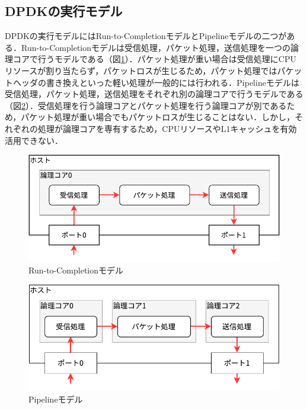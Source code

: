 \subsection{DPDKの実行モデル}
DPDKの実行モデルにはRun-to-CompletionモデルとPipelineモデルの二つがある．Run-to-Completionモデルは受信処理，パケット処理，送信処理を一つの論理コアで行うモデルである（図\ref{fig:RunToCompletion}）．パケット処理が重い場合は受信処理にCPUリソースが割り当たらず，パケットロスが生じるため，パケット処理ではパケットヘッダの書き換えといった軽い処理が一般的には行われる．Pipelineモデルは受信処理，パケット処理，送信処理をそれぞれ別の論理コアで行うモデルである（図\ref{fig:Pipeline}）．受信処理を行う論理コアとパケット処理を行う論理コアが別であるため，パケット処理が重い場合でもパケットロスが生じることはない．しかし，それぞれの処理が論理コアを専有するため，CPUリソースやL1キャッシュを有効活用できない．

\begin{figure}[htb]
  \centering
  \includegraphics[width=\columnwidth]{pictures/RunToCompletion.pdf}
  \caption{Run-to-Completionモデル}
  \label{fig:RunToCompletion}
\end{figure}

\begin{figure}[htb]
  \centering
  \includegraphics[width=\columnwidth]{pictures/Pipeline.pdf}
  \caption{Pipelineモデル}
  \label{fig:Pipeline}
\end{figure}

